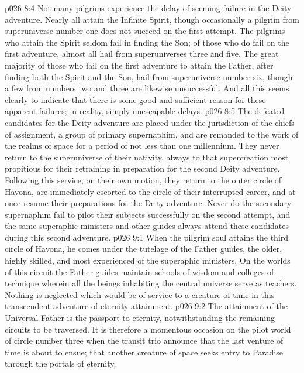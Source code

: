\pc \vs p026 8:4 Not many pilgrims experience the delay of seeming failure in the Deity adventure. Nearly all attain the Infinite Spirit, though occasionally a pilgrim from superuniverse number one does not succeed on the first attempt. The pilgrims who attain the Spirit seldom fail in finding the Son; of those who do fail on the first adventure, almost all hail from superuniverses three and five. The great majority of those who fail on the first adventure to attain the Father, after finding both the Spirit and the Son, hail from superuniverse number six, though a few from numbers two and three are likewise unsuccessful. And all this seems clearly to indicate that there is some good and sufficient reason for these apparent failures; in reality, simply unescapable delays.
\vs p026 8:5 The defeated candidates for the Deity adventure are placed under the jurisdiction of the chiefs of assignment, a group of primary supernaphim, and are remanded to the work of the realms of space for a period of not less than one millennium. They never return to the superuniverse of their nativity, always to that supercreation most propitious for their retraining in preparation for the second Deity adventure. Following this service, on their own motion, they return to the outer circle of Havona, are immediately escorted to the circle of their interrupted career, and at once resume their preparations for the Deity adventure. Never do the secondary supernaphim fail to pilot their subjects successfully on the second attempt, and the same superaphic ministers and other guides always attend these candidates during this second adventure.
%
\vs p026 9:1 When the pilgrim soul attains the third circle of Havona, he comes under the tutelage of the Father guides, the older, highly skilled, and most experienced of the superaphic ministers. On the worlds of this circuit the Father guides maintain schools of wisdom and colleges of technique wherein all the beings inhabiting the central universe serve as teachers. Nothing is neglected which would be of service to a creature of time in this transcendent adventure of eternity attainment.
\vs p026 9:2 The attainment of the Universal Father is the passport to eternity, notwithstanding the remaining circuits to be traversed. It is therefore a momentous occasion on the pilot world of circle number three when the transit trio announce that the last venture of time is about to ensue; that another creature of space seeks entry to Paradise through the portals of eternity.
